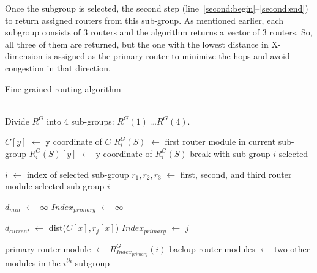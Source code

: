 Once the subgroup is selected, the second step (line~\ref{second:begin}--\ref{second:end}) to return assigned routers from this sub-group.
As mentioned earlier, each subgroup consists of 3 routers and the algorithm returns a vector of 3 routers. So, all three of them are 
returned, but the one with the lowest distance in X-dimension is assigned as the primary router to minimize the hops and avoid congestion 
in that direction. 


\begin{algorithm}
\caption{Fine-grained routing algorithm}
\label{alg:fgr}
\begin{algorithmic}[1]
 \\ 
\State Divide $R^G$ into 4 sub-groups: $R^G(1)$ \ldots $R^G(4)$.

\label{first:begin}
    \State $C[y]$ $\leftarrow$ y coordinate of $C$
    \State $R^G_{i}(S)$ $\leftarrow$ first router module in current sub-group
    \State $R^G_{i}(S)[y]$ $\leftarrow$ y coordinate of $R^G_{i}(S)$
    \State break with sub-group $i$ selected
    \EndIf
\EndFor
\label{first:end}

\State $i$ $\leftarrow$ index of selected sub-group
\label{second:begin}
\State $r_1, r_2, r_3$ $\leftarrow$ first, second, and third router module 
\State \hspace{\algorithmicindent} selected sub-group $i$

\State $d_{min}$ $\leftarrow$ $\infty$ 
\State $Index_{primary}$ $\leftarrow$ $\infty$

    \State $d_{current}$ $\leftarrow$ dist($C[x], r_j[x]$) 
        \State $Index_{primary}$ $\leftarrow$ $j$
        \EndIf

\EndFor

    \State primary router module $\leftarrow$ $R^G_{Index_{primary}}(i)$
    \State backup router modules $\leftarrow$ 
     two other modules in the $i^{th}$ subgroup

\label{second:end}

\EndProcedure
\\
\end{algorithmic}
\end{algorithm}


